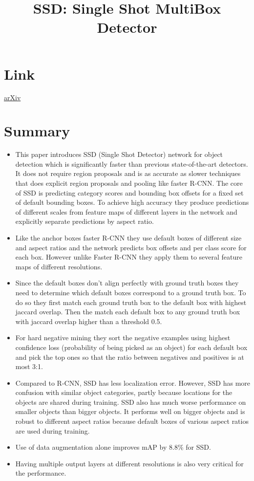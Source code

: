 \documentclass{article}
\title{SSD: Single Shot MultiBox Detector}
\author{}
\date{}
\begin{document}
\maketitle

\section*{Link}
\href{https://arxiv.org/abs/1512.02325}{arXiv} 

\section*{Summary}
\begin{itemize}
    \item This paper introduces SSD (Single Shot Detector) network for object detection which is significantly faster than previous state-of-the-art detectors. It does not require region proposals and is as accurate as slower techniques that does explicit region proposals and pooling like faster R-CNN. The core of SSD is predicting category scores and bounding box offsets for a fixed set of default bounding boxes. To achieve high accuracy they produce predictions of different scales from feature maps of different layers in the network and explicitly separate predictions by aspect ratio.
    \item Like the anchor boxes  faster R-CNN they use default boxes of different size and aspect ratios and the network predicts box offsets and per class score for each box. However unlike Faster R-CNN they apply them to several feature maps of different resolutions.
    \item Since the default boxes don't align perfectly with ground truth boxes they need to determine which default boxes correspond to a ground truth box. To do so they first match each ground truth box to the default box with highest jaccard overlap. Then the match each default box to any ground truth box with jaccard overlap higher than a threshold 0.5.
    \item For hard negative mining they sort the negative examples using highest confidence loss (probability of being picked as an object) for each default box and pick the top ones so that the ratio between negatives and positives is at most 3:1.
    \item Compared to R-CNN, SSD has less localization error. However, SSD has more confusion with similar object categories, partly because locations for the objects are shared during training. SSD also has much worse performance on smaller objects than bigger objects. It performs well on bigger objects and is robust to different aspect ratios because default boxes of various aspect ratios are used during training.
    \item Use of data augmentation alone improves mAP by 8.8\% for SSD.
    \item Having multiple output layers at different resolutions is also very critical for the performance.
    
\end{itemize}
\end{document}
